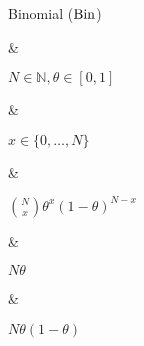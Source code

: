 Binomial ($\operatorname{Bin}$)

&

$N \in \mathbb N, \theta \in [0, 1]$

& 

$x \in \{0, \dotsc, N\}$

&

\(\displaystyle
	\binom{N}{x} \theta^x (1 - \theta)^{N - x}
\)

& 

$N\theta$

&

$N\theta(1 - \theta)$